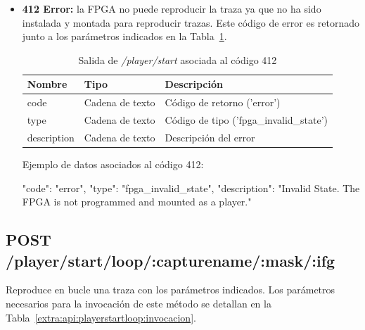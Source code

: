 \begin{itemize}
{\begin{minipage}{\textwidth}
Ejemplo de datos asociados al código 400:

\begin{code}[language=json]
{
  "code": "error",
  "type": "notification",
  "description": "Invalid parameters. The FPGA could not start playing a capture."
}
\end{code}
\end{minipage}
}

\item{\textbf{412 Error:} la \gls{FPGA} no puede reproducir la \gls{traza} ya que no ha sido instalada y montada para reproducir \glspl{traza}.
Este código de error es retornado junto a los parámetros indicados en la Tabla~\ref{extra:api:playerstart:error412}.
\begin{table}[H]
\centering
\begin{tabular}{|l|l|l|}
\hline
\rowcolor[HTML]{F5F5F5}
\textbf{Nombre}  & \textbf{Tipo}   & \textbf{Descripción}                    \\ \hline
code             & Cadena de texto & Código de retorno ('error')             \\ \hline
type             & Cadena de texto & Código de tipo ('fpga\_invalid\_state') \\ \hline
description      & Cadena de texto & Descripción del error                   \\ \hline
\end{tabular}
\caption{Salida de \textit{/player/start} asociada al código 412}
\label{extra:api:playerstart:error412}
\end{table}

\begin{minipage}{\textwidth}
Ejemplo de datos asociados al código 412:

\begin{code}[language=json]
{
  "code": "error",
  "type": "fpga_invalid_state",
  "description": "Invalid State. The FPGA is not programmed and mounted as a player."
}
\end{code}
\end{minipage}
}

\end{itemize}

%
%
\subsection{POST /player/start/loop/:capturename/:mask/:ifg}
Reproduce en bucle una \gls{traza} con los parámetros indicados.
Los parámetros necesarios para la invocación de este método se detallan en la Tabla~\ref{extra:api:playerstartloop:invocacion}.

